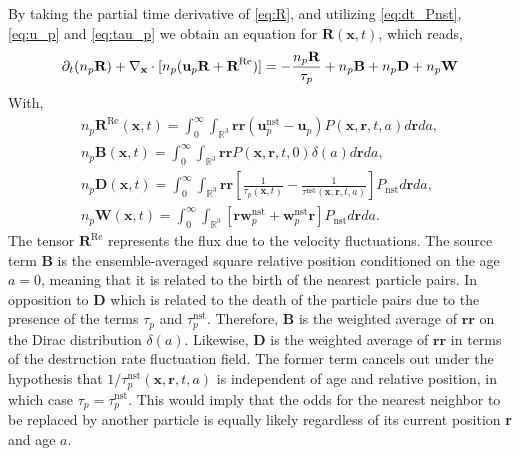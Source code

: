By taking the partial time derivative of \ref{eq:R}, and utilizing \ref{eq:dt_Pnst}, \ref{eq:u_p} and \ref{eq:tau_p} we obtain an equation for $\textbf{R}(\textbf{x},t)$, which reads,
\begin{equation}
    \pddt (n_p\textbf{R})
    + \pddx \cdot [n_p(\textbf{u}_p\textbf{R}
    + \textbf{R}^\text{Re})]
    = 
    - \frac{n_p\textbf{R}}{\tau_p}
    +n_p\textbf{B}
    + n_p\textbf{D}
    + n_p\textbf{W}
    \label{eq:dt_R}
\end{equation}
With,
\begin{align*}
    n_p \textbf{R}^\text{Re}(\textbf{x},t)
    =
    \int_{0}^\infty
    \int_{\mathbb{R}^3}
    \textbf{rr}(\textbf{u}^\text{nst}_p - \textbf{u}_p)
    P(\textbf{x},\textbf{r},t,a)
    d\textbf{r}da,\\
    n_p \textbf{B}(\textbf{x},t)
    =
    \int_{0}^\infty
    \int_{\mathbb{R}^3}
    \textbf{rr}
    P(\textbf{x},\textbf{r},t,0)\delta(a)
    d\textbf{r}da, \\
    n_p\textbf{D}(\textbf{x},t) = 
    \int_{0}^\infty
    \int_{\mathbb{R}^3} \textbf{rr}
    \left[
        \frac{1}{\tau_p(\textbf{x},t)}
        - \frac{1}{\tau^\text{nst}(\textbf{x},\textbf{r},t,a)}
    \right]
    P_\text{nst}
    d\textbf{r}
    da,\\
    n_p \textbf{W}(\textbf{x},t) = 
    \int_{0}^\infty
    \int_{\mathbb{R}^3} \left[
        \textbf{r} \textbf{w}^\text{nst}_p
        + \textbf{w}^\text{nst}_p\textbf{r}
    \right]P_\text{nst}
    d\textbf{r}
    da.
\end{align*} 
The tensor $\textbf{R}^\text{Re}$ represents the flux due to the velocity fluctuations. 
The source term $\textbf{B}$ is the ensemble-averaged square relative position conditioned on the age $a=0$, meaning that it is related to the birth of the nearest particle pairs. 
In opposition to \textbf{D} which is related to the death of the particle pairs due to the presence of the terms $\tau_p$ and $\tau_p^\text{nst}$.
Therefore, $\textbf{B}$ is the weighted average of $\textbf{rr}$ on the Dirac distribution $\delta(a)$. 
Likewise, $\textbf{D}$ is the weighted average of $\textbf{rr}$ in terms of the destruction rate fluctuation field. 
The former term cancels out under the hypothesis that $1 / \tau^\text{nst}_p(\textbf{x},\textbf{r},t,a)$ is independent of age and relative position, in which case $\tau_p = \tau^\text{nst}_p$. 
This would imply that the odds for the nearest neighbor to be replaced by another particle is equally likely regardless of its current position \textbf{r} and age $a$. 
